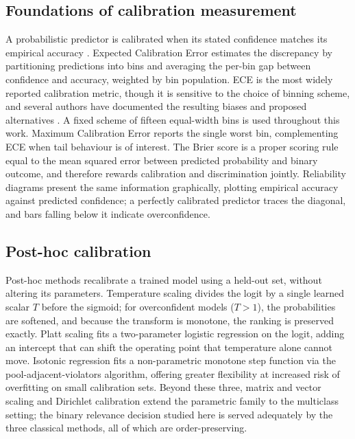 \documentclass[sn-mathphys-num,pdflatex]{sn-jnl}
\begin{document}
\subsection{Foundations of calibration measurement}\label{sec:rw-cal}
A probabilistic predictor is calibrated when its stated confidence matches its
empirical accuracy \cite{degroot1983}. Expected Calibration Error
\cite{naeini2015} estimates the discrepancy by partitioning predictions into
bins and averaging the per-bin gap between confidence and accuracy, weighted by
bin population. ECE is the most widely reported calibration metric, though it is
sensitive to the choice of binning scheme, and several authors have documented
the resulting biases and proposed alternatives
\cite{nixon2019,kumar2019,roelofs2022}. A fixed scheme of fifteen equal-width
bins is used throughout this work. Maximum Calibration Error reports the single
worst bin, complementing ECE when tail behaviour is of interest. The Brier score
\cite{brier1950} is a proper scoring rule equal to the mean squared error between
predicted probability and binary outcome, and therefore rewards calibration and
discrimination jointly. Reliability diagrams \cite{degroot1983,niculescu2005}
present the same information graphically, plotting empirical accuracy against
predicted confidence; a perfectly calibrated predictor traces the diagonal, and
bars falling below it indicate overconfidence.

\subsection{Post-hoc calibration}\label{sec:rw-posthoc}
Post-hoc methods recalibrate a trained model using a held-out set, without
altering its parameters. Temperature scaling \cite{guo2017} divides the logit by
a single learned scalar $T$ before the sigmoid; for overconfident models
($T>1$), the probabilities are softened, and because the transform is monotone,
the ranking is preserved exactly. Platt scaling \cite{platt1999} fits a
two-parameter logistic regression on the logit, adding an intercept that can
shift the operating point that temperature alone cannot move. Isotonic regression
\cite{zadrozny2002} fits a non-parametric monotone step function via the
pool-adjacent-violators algorithm, offering greater flexibility at increased risk
of overfitting on small calibration sets. Beyond these three, matrix and vector
scaling and Dirichlet calibration \cite{kull2019} extend the parametric family to
the multiclass setting; the binary relevance decision studied here is served
adequately by the three classical methods, all of which are order-preserving.
\end{document}

